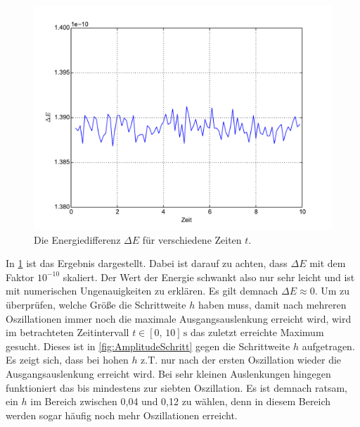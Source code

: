 \begin{figure}[h]
	\centering
	\includegraphics[width = \textwidth]{../Plots/Plot_2_B_Energie.pdf}
	\caption{Die Energiedifferenz $\Delta E$ für verschiedene Zeiten $t$.\label{fig:EnergieDiff}}
\end{figure}
In \cref{fig:EnergieDiff} ist das Ergebnis dargestellt. Dabei ist darauf zu achten, dass $\Delta E$ mit dem Faktor $10^{-10}$ skaliert.
Der Wert der Energie schwankt also nur sehr leicht und ist mit numerischen Ungenauigkeiten zu erklären.
Es gilt demnach $\Delta E\approx 0$.
\newpage
Um zu überprüfen, welche Größe die Schrittweite $h$ haben muss, damit nach mehreren Oszillationen immer noch die maximale Ausgangsauslenkung erreicht wird, wird im betrachteten Zeitintervall $t\in[0,\,10]\,\text{s}$ das zuletzt erreichte Maximum gesucht.
Dieses ist in \cref{fig:AmplitudeSchritt} gegen die Schrittweite $h$ aufgetragen.
Es zeigt sich, dass bei hohen $h$ z.T. nur nach der ersten Oszillation wieder die Ausgangsauslenkung erreicht wird.
Bei sehr kleinen Auslenkungen hingegen funktioniert das bis mindestens zur siebten Oszillation.
Es ist demnach ratsam, ein $h$ im Bereich zwischen 0,04 und 0,12 zu wählen, denn in diesem Bereich werden sogar häufig noch mehr Oszillationen erreicht.
